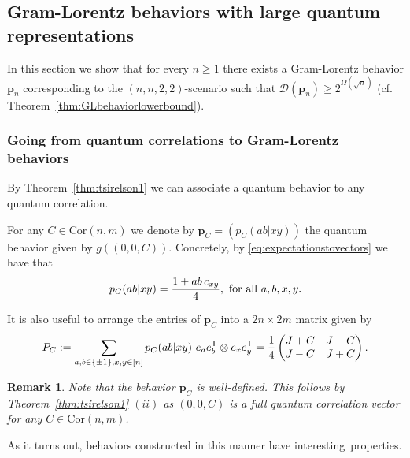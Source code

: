 \documentclass{siamart}
\newtheorem{remark}{Remark}[section]
\begin{document}
{\subsection{Gram-Lorentz behaviors with large quantum representations}\label{sec:glbehaviorsstuff}

{In this section  we show that for every $n\ge 1$ there exists a Gram-Lorentz behavior ${\mathbf{p}}_n$ corresponding to the $(n,n,2,2)$-scenario such that  $\mathcal{D}({\mathbf{p}}_n)\ge 2^{\Omega(\sqrt{n})}$ (cf. Theorem~\ref{thm:GLbehaviorlowerbound}). }

\subsubsection{Going from quantum correlations to {Gram-Lorentz} behaviors}\label{sec:corrtobeha}

By Theorem~\ref{thm:tsirelson1} we can associate a quantum behavior to any  quantum  correlation.

\medskip 
\begin{definition}\label{def:goodbehaviors}
For any  {$C \in {\mathrm{Cor}(n,m)}$} we denote by  ${\mathbf{p}}_C=(p_C(ab|xy))$ the quantum behavior  given by {$g((0,0,C))$}.  Concretely, by  \eqref{eq:expectationstovectors}  we have   that
\begin{equation}\label{eq:inversec}
p_C(ab|xy)={1 + ab \, c_{xy} \over 4}, \text{ for all }a,b,x,y.
\end{equation}
\end{definition}
\medskip

It is also useful to arrange the entries of ${\mathbf{p}}_C$ into a $2n\times 2m$ matrix given by
\begin{equation}\label{eq:behaviormatrix}
P_C:=\sum_{a,b\in \{\pm 1\} ,x,y\in [n]}p_C(ab|xy)\  e_ae_b^{{\sf T}}\otimes e_xe_y^{{\sf T}}={1\over 4}\begin{pmatrix}J+C & J-C\\J-C& J+C\end{pmatrix}.
\end{equation}

\medskip
\begin{remark} {Note that the behavior $ {\mathbf{p}}_C$ is well-defined. This follows by Theorem~\ref{thm:tsirelson1} $(ii)$ as $(0,0,C)$ is a full quantum  correlation vector for  any $C \in {\mathrm{Cor}(n,m)}$.  }
\end{remark}
\medskip

{As it turns out,  behaviors constructed in this manner have interesting~properties.}

}
\end{document}
